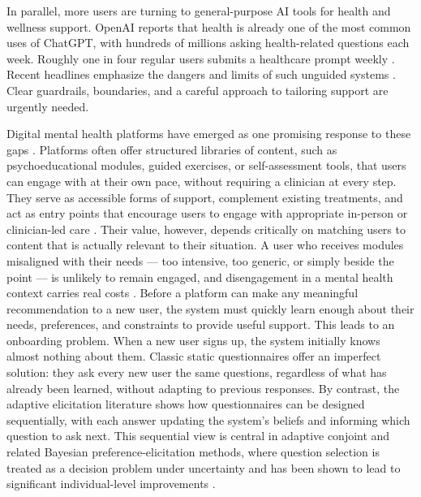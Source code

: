 \documentclass{article}
\begin{document}
In parallel, more users are turning to general-purpose AI tools for health and wellness support. OpenAI reports that health is already one of the most common uses of ChatGPT, with hundreds of millions asking health-related questions each week. Roughly one in four regular users submits a healthcare prompt weekly \cite{openai2026healthcareally}. Recent headlines emphasize the dangers and limits of such unguided systems \cite{hall2025chatgpt_dangerous_advice, kuznia_gordon_lavandera2025chatgpt_suicide_lawsuit, luo2025digital_therapist, wu2025illinois_ai_therapy_ban}. Clear guardrails, boundaries, and a careful approach to tailoring support are urgently needed.


Digital mental health platforms have emerged as one promising response to these gaps \cite{linardon2024mindfulness_apps, loechner2025digital_interventions_mental_health}. Platforms often offer structured libraries of content, such as psychoeducational modules, guided exercises, or self-assessment tools, that users can engage with at their own pace, without requiring a clinician at every step. They serve as accessible forms of support, complement existing treatments, and act as entry points that encourage users to engage with appropriate in-person or clinician-led care \cite{huang2024dmhi_waiting_lists}. Their value, however, depends critically on matching users to content that is actually relevant to their situation. A user who receives modules misaligned with their needs --- too intensive, too generic, or simply beside the point --- is unlikely to remain engaged, and disengagement in a mental health context carries real costs \cite{borghouts2021engagement, smith2025engagement_attrition_dmh}. Before a platform can make any meaningful recommendation to a new user, the system must quickly learn enough about their needs, preferences, and constraints to provide useful support.
This leads to an onboarding problem. When a new user signs up, the system initially knows almost nothing about them. Classic static questionnaires offer an imperfect solution: they ask every new user the same questions, regardless of what has already been learned, without adapting to previous responses. By contrast, the adaptive elicitation literature shows how questionnaires can be designed sequentially, with each answer updating the system's beliefs and informing which question to ask next. This sequential view is central in adaptive conjoint and related Bayesian preference-elicitation methods, where question selection is treated as a decision problem under uncertainty and has been shown to lead to significant individual-level improvements \cite{poly, ellipsoidal, toubia2013deep}.
\end{document}
